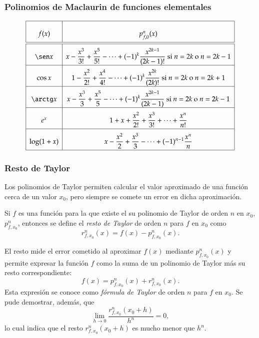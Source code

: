 \begin{frame}
	\frametitle{Polinomios de Maclaurin de funciones elementales}
	\[
		\renewcommand{\arraystretch}{2.5}
		\begin{array}{|c|c|}
			\hline
			f(x)      & p_{f,0}^n(x)                                                                                                      \\
			\hline\hline
			\sen x    & \displaystyle x-\frac{x^3}{3!}+\frac{x^5}{5!}-\cdots +(-1)^k\frac{x^{2k-1}}{(2k-1)!} \mbox{ si $n=2k$ o $n=2k-1$} \\
			\hline
			\cos x    & \displaystyle 1-\frac{x^2}{2!}+\frac{x^4}{4!}-\cdots +(-1)^k\frac{x^{2k}}{(2k)!} \mbox{ si $n=2k$ o $n=2k+1$}     \\
			\hline
			\arctg x  & \displaystyle x-\frac{x^3}{3}+\frac{x^5}{5}-\cdots +(-1)^k\frac{x^{2k-1}}{(2k-1)} \mbox{ si $n=2k$ o $n=2k-1$}    \\
			\hline
			e^x       & \displaystyle 1+x+\frac{x^2}{2!}+\frac{x^3}{3!}+\cdots + \frac{x^n}{n!}                                           \\
			\hline
			\log(1+x) & \displaystyle x-\frac{x^2}{2}+\frac{x^3}{3}-\cdots +(-1)^{n-1}\frac{x^n}{n}                                       \\
			\hline
		\end{array}
	\]
\end{frame}


\begin{frame}
	\frametitle{Resto de Taylor}
	Los polinomios de Taylor permiten calcular el valor aproximado de una función cerca de un valor $x_0$, pero siempre se comete un error en dicha aproximación.
	\begin{definicion}
		Si $f$ es una función para la que existe el su polinomio de Taylor de orden $n$ en $x_0$, $p_{f,x_0}^n$, entonces se define el \emph{resto de Taylor} de orden $n$ para $f$ en $x_0$ como
		\[
			r_{f,x_0}^n(x)=f(x)-p_{f,x_0}^n(x).
		\]
	\end{definicion}
	
	El resto mide el error cometido al aproximar $f(x)$ mediante $p_{f,x_0}^n(x)$ y permite expresar la función $f$ como la suma de un polinomio de Taylor más su resto correspondiente:
	\[
		f(x)=p_{f,x_0}^n(x) + r_{f,x_0}^n(x).
	\]
	Esta expresión se conoce como \emph{fórmula de Taylor} de orden $n$ para $f$ en $x_0$. Se pude demostrar, además, que
	\[
		\lim_{h\rightarrow 0}\frac{r_{f,x_0}^n(x_0+h)}{h^n}=0,
	\]
	lo cual indica que el resto $r_{f,x_0}^n(x_0+h)$ es mucho menor que $h^n$.
\end{frame}



